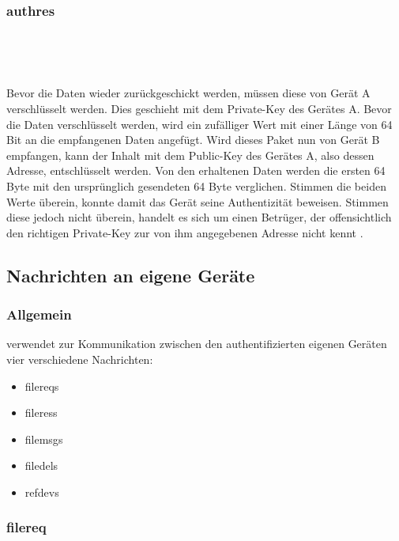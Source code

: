 \subsubsection{\gls{authres}}
\messagestart
	 \\
	
	\begin{rightwordgroup}{\isprotomsgtype}
	\end{rightwordgroup} \\
	
	\begin{rightwordgroup}{\isprotomsgdata}
	\end{rightwordgroup}
	
Bevor die Daten wieder zurückgeschickt werden, müssen diese von Gerät A verschlüsselt werden. Dies geschieht mit dem Private-Key des Gerätes A. Bevor die Daten verschlüsselt werden, wird ein zufälliger Wert mit einer Länge von 64 Bit an die empfangenen Daten angefügt.
Wird dieses Paket nun von Gerät B empfangen, kann der Inhalt mit dem Public-Key des Gerätes A, also dessen Adresse, entschlüsselt werden. Von den erhaltenen Daten werden die ersten 64 Byte mit den ursprünglich gesendeten 64 Byte verglichen. Stimmen die beiden Werte überein, konnte damit das Gerät seine Authentizität beweisen. Stimmen diese jedoch nicht überein, handelt es sich um einen Betrüger, der offensichtlich den richtigen Private-Key zur von ihm angegebenen Adresse nicht kennt .
		
\subsection{Nachrichten an eigene Geräte}
\subsubsection{Allgemein}
\sblitg verwendet zur Kommunikation zwischen den authentifizierten eigenen Geräten vier verschiedene Nachrichten:
\begin{itemize}
	\item \gls{filereq}s
	\item \gls{fileres}s
	\item \gls{filemsg}s
	\item \gls{filedel}s
	\item \gls{refdev}s
\end{itemize}

\subsubsection{\gls{filereq}} \label{Dateianfrage}
\messagestart
	 \\
	
